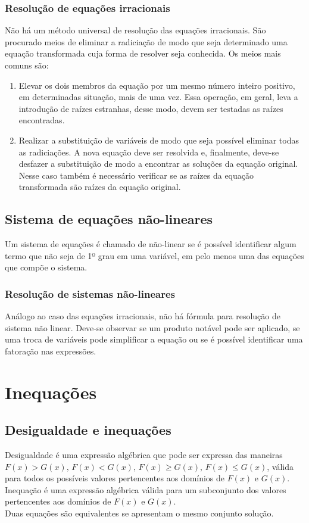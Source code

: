\documentclass{article}
\begin{document}
\subsubsection{Resolução de equações irracionais}
Não há um método universal de resolução das equações irracionais. São procurado meios de eliminar a radiciação de modo que seja determinado uma equação transformada cuja forma de resolver seja conhecida. Os meios mais comuns são:
\begin{enumerate}
    \item Elevar os dois membros da equação por um mesmo número inteiro positivo, em determinadas situação, mais de uma vez. Essa operação, em geral, leva a introdução de raízes estranhas, desse modo, devem ser testadas as raízes encontradas.
    \item Realizar a substituição de variáveis de modo que seja possível eliminar todas as radiciações. A nova equação deve ser resolvida e, finalmente, deve-se desfazer a substituição de modo a encontrar as soluções da equação original. Nesse caso também é necessário verificar se as raízes da equação transformada são raízes da equação original.
\end{enumerate}

\subsection{Sistema de equações não-lineares}
Um sistema de equações é chamado de não-linear se é possível identificar algum termo que não seja de 1º grau em uma variável, em pelo menos uma das equações que compõe o sistema.

\subsubsection{Resolução de sistemas não-lineares}
Análogo ao caso das equações irracionais, não há fórmula para resolução de sistema não linear. Deve-se observar se um produto notável pode ser aplicado, se uma troca de variáveis pode simplificar a equação ou se é possível identificar uma fatoração nas expressões.


\section{Inequações}
\subsection{Desigualdade e inequações}
Desigualdade é uma expressão algébrica que pode ser expressa das maneiras $F(x)>G(x), \, F(x)<G(x),\, F(x)\geq G(x), \, F(x)\leq G(x)$, válida para todos os possíveis valores pertencentes aos domínios de $F(x)$ e $G(x)$.\\
\indent Inequação é uma expressão algébrica válida para um subconjunto dos valores pertencentes aos domínios de $F(x)$ e $G(x)$. \\
\indent Duas equações são equivalentes se apresentam o mesmo conjunto solução.
\end{document}
